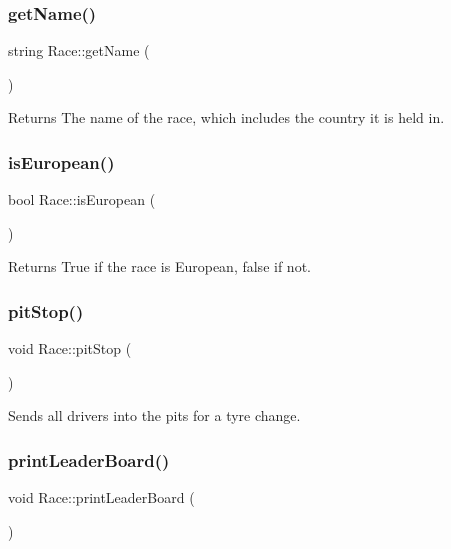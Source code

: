 \subsubsection{\texorpdfstring{get\+Name()}{getName()}}
{\footnotesize\ttfamily string Race\+::get\+Name (\begin{DoxyParamCaption}{ }\end{DoxyParamCaption})}

\begin{DoxyReturn}{Returns}
The name of the race, which includes the country it is held in. 
\end{DoxyReturn}
\mbox{\label{classRace_a1fb45997b626b183e86e1726d91d1263}} 
\subsubsection{\texorpdfstring{is\+European()}{isEuropean()}}
{\footnotesize\ttfamily bool Race\+::is\+European (\begin{DoxyParamCaption}{ }\end{DoxyParamCaption})}

\begin{DoxyReturn}{Returns}
True if the race is European, false if not. 
\end{DoxyReturn}
\mbox{\label{classRace_a79ac9d5338dce7e35a17d77b4b6f85b1}} 
\subsubsection{\texorpdfstring{pit\+Stop()}{pitStop()}}
{\footnotesize\ttfamily void Race\+::pit\+Stop (\begin{DoxyParamCaption}{ }\end{DoxyParamCaption})\hspace{0.3cm}{\ttfamily [private]}}

Sends all drivers into the pits for a tyre change. \mbox{\label{classRace_a137e1b46846619d85d1fd5af06cb9a44}} 
\subsubsection{\texorpdfstring{print\+Leader\+Board()}{printLeaderBoard()}}
{\footnotesize\ttfamily void Race\+::print\+Leader\+Board (\begin{DoxyParamCaption}{ }\end{DoxyParamCaption})}

